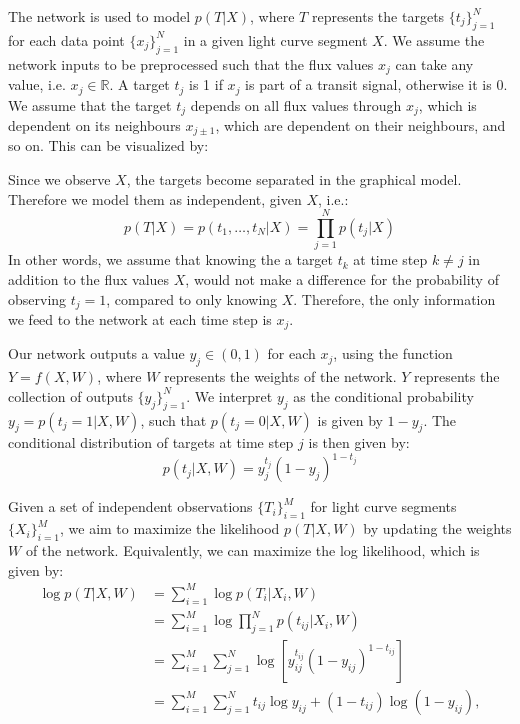 
The network is used to model $p(T|X)$, where $T$ represents the targets $\{t_j\}_{j=1}^N$ for each data point $\{x_j\}_{j=1}^N$ in a given light curve segment $X$. We assume the network inputs to be preprocessed such that the flux values $x_j$ can take any value, i.e. $x_j \in \mathbb{R}$. A target $t_j$ is 1 if $x_j$ is part of a transit signal, otherwise it is 0. We assume that the target $t_j$ depends on all flux values through $x_j$, which is dependent on its neighbours $x_{j\pm1}$, which are dependent on their neighbours, and so on. This can be visualized by:

\begin{figure}[H]
\centering
\end{figure}
\noindent Since we observe $X$, the targets become separated in the graphical model. Therefore we model them as independent, given $X$, i.e.:
\begin{equation}
    p(T|X) = p(t_1,\dots,t_N|X) = \prod_{j=1}^N p(t_j|X)
\end{equation}
In other words, we assume that knowing the a target $t_{k}$ at time step $k \neq j$ in addition to the flux values $X$, would not make a difference for the probability of observing $t_j = 1$, compared to only knowing $X$. Therefore, the only information we feed to the network at each time step is $x_j$.

Our network outputs a value $y_j \in (0,1)$ for each $x_j$, using the function $Y = f(X, W)$, where $W$ represents the weights of the network. $Y$ represents the collection of outputs $\{y_j\}_{j=1}^N$. We interpret $y_j$ as the conditional probability $y_j = p(t_j=1|X,W)$, such that $p(t_j=0|X,W)$ is given by $1-y_j$. The conditional distribution of targets at time step $j$ is then given by:
\begin{equation}
    p(t_j|X,W) = y_j^{t_j} (1-y_j)^{1-t_j}
\end{equation}

\noindent Given a set of independent observations $\{T_i\}_{i=1}^M$ for light curve segments $\{X_i\}_{i=1}^M$, we aim to maximize the likelihood $p(T|X,W)$ by updating the weights $W$ of the network. Equivalently, we can maximize the log likelihood, which is given by:
\begin{align}
    \log p(T|X,W) &= \sum_{i=1}^M \log  p(T_i|X_i,W) \\
    &= \sum_{i=1}^M \log \prod_{j=1}^N p(t_{ij}|X_i,W) \\
    &= \sum_{i=1}^M \sum_{j=1}^N \log [ y_{ij}^{t_{ij}} (1-y_{ij})^{1-t_{ij}} ] \\
    &= \sum_{i=1}^M \sum_{j=1}^N t_{ij} \log y_{ij} + (1-t_{ij}) \log(1-y_{ij}),
\end{align}

